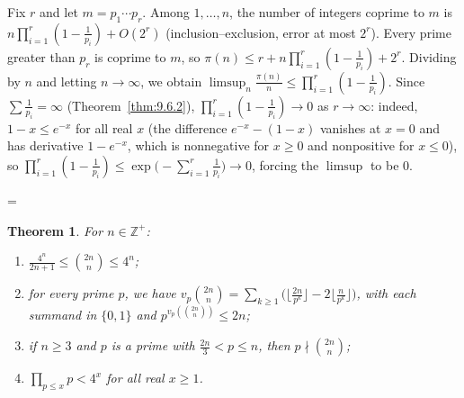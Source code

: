 \documentclass[11pt]{article}
\makeatletter
\theoremstyle{ntstyle}
\newtheorem{theorem}{Theorem}[subsection]
\let\nt@closedisplay\]
\def\nt@guardedclose{\@ifnextchar\par{\nt@closeafterpar}{\@ifnextchar\end{\postdisplaypenalty\@M\nt@closedisplay}{\nt@closedisplay}}}
\def\nt@closeafterpar\par{\@ifnextchar\par{\nt@closeafterpar}{\@ifnextchar\end{\postdisplaypenalty\@M\nt@closedisplay\par}{\nt@closedisplay\par}}}
\renewenvironment{proof}[1][\proofname]{\par
  \pushQED{\qed}\normalfont\topsep\medskipamount\edef\nt@afterproof{\@endparpenalty=\the\@endparpenalty\relax}\@beginparpenalty\@M\@endparpenalty\@M\let\]\nt@guardedclose\trivlist\item[]\textit{#1\@addpunct{.}} \ignorespaces}{\ifvmode\addpenalty\@M\fi\popQED\nt@afterproof\endtrivlist\@endpefalse}
\makeatother
\begin{document}
\begin{proof} Fix $r$ and let $m = p_1\cdots p_r$. Among
	$1,\ldots,n$, the number of integers coprime to $m$ is
	$n\prod_{i=1}^r(1-\tfrac{1}{p_i}) + O(2^r)$ (inclusion--exclusion,
	error at most $2^r$). Every prime greater than $p_r$ is coprime to $m$, so
	$\pi(n) \le r + n\prod_{i=1}^r(1-\tfrac{1}{p_i}) + 2^r$. Dividing by
	$n$ and letting $n\to\infty$, we obtain $\limsup_n \tfrac{\pi(n)}{n} \le
		\prod_{i=1}^r(1-\tfrac{1}{p_i})$. Since $\sum\tfrac{1}{p_i}=\infty$
	(Theorem~\ref{thm:9.6.2}), $\prod_{i=1}^r(1-\tfrac{1}{p_i})\to 0$ as
	$r\to\infty$: indeed, $1-x\le e^{-x}$ for all real $x$ (the difference
	$e^{-x}-(1-x)$ vanishes at $x=0$ and has derivative $1-e^{-x}$, which is
	nonnegative for $x\ge0$ and nonpositive for $x\le0$), so
	$\prod_{i=1}^{r}(1-\tfrac{1}{p_i})\le\exp\big(-\sum_{i=1}^{r}\tfrac{1}{p_i}\big)\to0$,
	forcing the $\limsup$ to be $0$.

\end{proof}
\begin{theorem}\label{thm:9.6.4} For $n\in\mathbb{Z}^+$:
	\begin{enumerate}[label={\alph*)}]
		\item $\tfrac{4^n}{2n+1}\le\binom{2n}{n}\le 4^n$;
		\item for every prime $p$,
		      we have $v_p\!\binom{2n}{n}=\sum_{k\ge1}\big(\lfloor\tfrac{2n}{p^k}\rfloor-2\lfloor\tfrac{n}{p^k}\rfloor\big)$,
		      with each summand in $\{0,1\}$ and
		      $p^{v_p(\binom{2n}{n})}\le 2n$;
		\item if $n\ge3$ and $p$ is a prime with $\tfrac{2n}{3}<p\le n$, then
		      $p\nmid\binom{2n}{n}$;
		\item $\prod_{p\le x}p<4^{x}$ for all real $x\ge1$.
	\end{enumerate}

\end{theorem}
\end{document}
